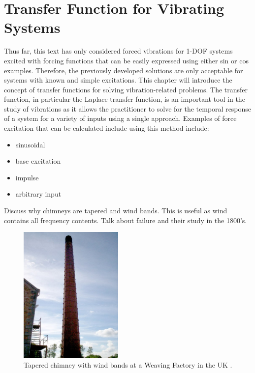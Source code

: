 \documentclass[12pt,letter]{article}
\begin{document}
	
	\setcounter{section}{3}	
	\setcounter{figure}{0}   
	\renewcommand\thefigure{\thesection.\arabic{figure}}
	\setcounter{equation}{0}   
	\renewcommand\theequation{\thesection.\arabic{equation}}

	\section{Transfer Function for Vibrating Systems}


		Thus far, this text has only considered forced vibrations for 1-DOF systems excited with forcing functions that can be easily expressed using either sin or cos examples. Therefore, the previously developed solutions are only acceptable for systems with known and simple excitations. This chapter will introduce the concept of transfer functions for solving vibration-related problems. The transfer function, in particular the Laplace transfer function, is an important tool in the study of vibrations as it allows the practitioner to solve for the temporal response of a system for a variety of inputs using a single approach. Examples of force excitation that can be calculated include using this method include:
		\begin{itemize}
			\item sinusoidal
			\item base excitation
			\item impulse
			\item arbitrary input
		\end{itemize}


		\begin{vibration_case_study}
			Discuss why chimneys are tapered and wind bands. This is useful as wind contains all frequency contents. Talk about failure and their study in the 1800's.
			\begin{figure}[H]
				\centering
				\includegraphics[width=2in]{../figures/tapered_chimney}
				\caption{Tapered chimney with wind bands at a Weaving Factory in the UK \protect\footnotemark[1].}
			\end{figure}
		\end{vibration_case_study}
\end{document}
